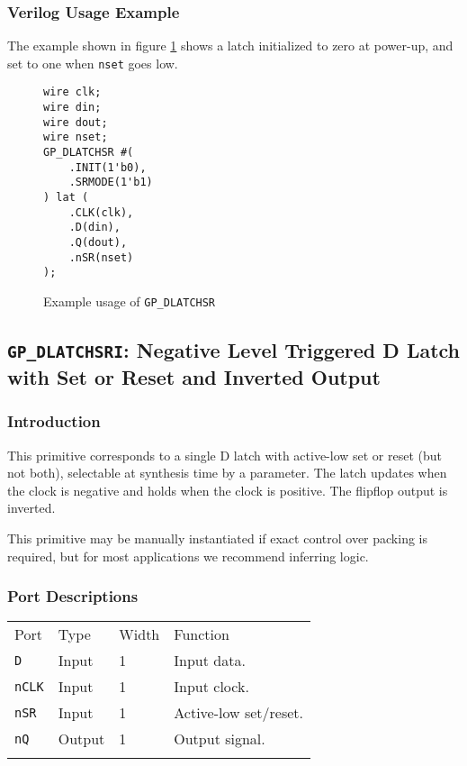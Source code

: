 \documentclass[11pt]{article}
\newcommand{\tokenstyle}[1]{\texttt{#1}}
\newcommand{\wirestyle}[1]{\texttt{#1}}
\newcommand{\whenstyle}[1]{{\fontseries{sb}\selectfont#1}}
\newcommand{\thinhline}{\Xhline{1\arrayrulewidth}}
\newcommand{\thickhline}{\Xhline{2.5\arrayrulewidth}}
\begin{document}
\subsubsection{Verilog Usage Example}

The example shown in figure \ref{gp-dlatchsr-example} shows a latch initialized to zero at power-up, and set to one
when \wirestyle{nset} goes low.

\begin{figure}[h]
\begin{lstlisting}
wire clk;
wire din;
wire dout;
wire nset;
GP_DLATCHSR #(
	.INIT(1'b0),
	.SRMODE(1'b1)
) lat (
	.CLK(clk),
	.D(din),
	.Q(dout),
	.nSR(nset)
);
\end{lstlisting}
\caption{Example usage of \tokenstyle{GP\_DLATCHSR}}
\label{gp-dlatchsr-example}
\end{figure}


\pagebreak
\subsection{\tokenstyle{GP\_DLATCHSRI}: Negative Level Triggered D Latch with Set or Reset and Inverted Output}
\label{gp-latchsri}

\subsubsection{Introduction}
This primitive corresponds to a single D latch with active-low set or reset (but not both), selectable at synthesis time by 
a parameter. The latch updates when the clock is negative and holds when the clock is positive. The flipflop output is 
inverted.

This primitive may be manually instantiated if exact control over packing is required, but for most applications we
recommend inferring logic.

\subsubsection{Port Descriptions}

\begin{tabularx}{\textwidth}{lllX}
\thinhline
\whenstyle{Port} & \whenstyle{Type} & \whenstyle{Width} & \whenstyle{Function} \\
\thickhline
\tokenstyle{D} & Input & 1 & Input data. \\
\thinhline
\tokenstyle{nCLK} & Input & 1 & Input clock. \\
\thinhline
\tokenstyle{nSR} & Input & 1 & Active-low set/reset. \\
\thinhline
\tokenstyle{nQ} & Output & 1 & Output signal. \\
\thinhline
\end{tabularx}
\end{document}

